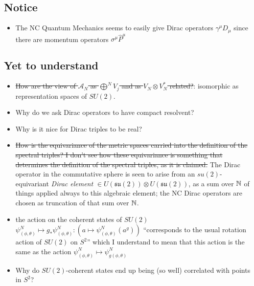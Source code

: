 \documentclass{article}
\newcommand{\sut}{\ensuremath{\mathfrak{su}(2)}}
\begin{document}
\subsection{Notice}

    \begin{itemize}

    \item The NC Quantum Mechanics seems to easily give Dirac operators $\gamma^\mu D_\mu$ since there are momentum operators $\sigma^\mu \hat P^\mu$
    
    \end{itemize}

\subsection{Yet to understand}

    \begin{itemize}

    \item \sout{How are the view of $\mathcal A_N$ as $\bigoplus^N V_j$ and as $V_{N} \otimes V_N^*$ related?}: isomorphic as representation spaces of $SU(2)$.
    
    \item Why do we ask Dirac operators to have compact resolvent?
    
    \item Why is it nice for Dirac triples to be real?
    
    \item \sout{How is the equivariance of the metric spaces carried into the definition of the spectral triples? I don't see how these equivariance is something that determines the definition of the spectral triples, as it is claimed.} The Dirac operator in the commutative sphere is seen to arise from an $su(2)$-equivariant \textit{Dirac element} $\in U(\sut)\otimes U(\sut)$, as a sum over $\mathbb{N}$ of things applied always to this algebraic element; the NC Dirac operators are chosen as truncation of that sum over $\mathbb{N}$.
    
    \item {} the action on the coherent states of $SU(2)$ $\psi^N_{(\phi, \theta)} \mapsto g_*\psi^N_{(\phi, \theta)}:(a \mapsto \psi^N_{(\phi, \theta)}(a^g))$ ``corresponds to the usual rotation action of $SU(2)$ on $S^2$'' which I understand to mean that this action is the same as the action $\psi^N_{(\phi, \theta)} \mapsto \psi^N_{g(\phi, \theta)}$
    
    \item Why do $SU(2)$-coherent states end up being (so well) correlated with points in $S^2$?
    
    \end{itemize}
\end{document}

